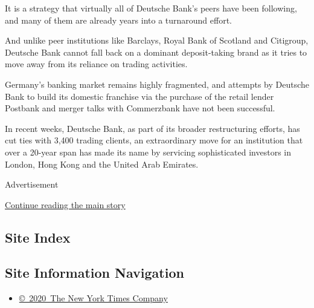 It is a strategy that virtually all of Deutsche Bank's peers have been
following, and many of them are already years into a turnaround effort.

And unlike peer institutions like Barclays, Royal Bank of Scotland and
Citigroup, Deutsche Bank cannot fall back on a dominant deposit-taking
brand as it tries to move away from its reliance on trading activities.

Germany's banking market remains highly fragmented, and attempts by
Deutsche Bank to build its domestic franchise via the purchase of the
retail lender Postbank and merger talks with Commerzbank have not been
successful.

In recent weeks, Deutsche Bank, as part of its broader restructuring
efforts, has cut ties with 3,400 trading clients, an extraordinary move
for an institution that over a 20-year span has made its name by
servicing sophisticated investors in London, Hong Kong and the United
Arab Emirates.

Advertisement

\protect\hyperlink{after-bottom}{Continue reading the main story}

\hypertarget{site-index}{%
\subsection{Site Index}\label{site-index}}

\hypertarget{site-information-navigation}{%
\subsection{Site Information
Navigation}\label{site-information-navigation}}

\begin{itemize}
\tightlist
\item
  \href{https://help.nytimes.com/hc/en-us/articles/115014792127-Copyright-notice}{©~2020~The
  New York Times Company}
\end{itemize}

